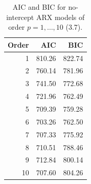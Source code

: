 \begin{table}[ht]
\centering
\caption{AIC and BIC for no-intercept ARX models of order $p = 1, \ldots, 10$ (3.7).} 
\label{tab:ic}
\begin{tabular}{rrr}
  \toprule
Order & AIC & BIC \\ 
  \midrule
1 & 810.26 & 822.74 \\ 
  2 & 760.14 & 781.96 \\ 
  3 & 741.50 & 772.68 \\ 
  4 & 721.96 & 762.49 \\ 
  5 & 709.39 & 759.28 \\ 
  6 & 703.26 & 762.50 \\ 
  7 & 707.33 & 775.92 \\ 
  8 & 710.51 & 788.46 \\ 
  9 & 712.84 & 800.14 \\ 
  10 & 707.60 & 804.26 \\ 
   \bottomrule
\end{tabular}
\end{table}
